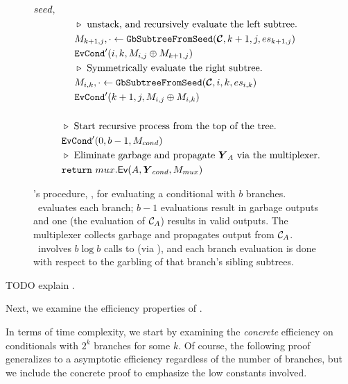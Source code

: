 \begin{figure}
\begin{align*}
{    seed,}\\
    &~~~~~~\codecomment{unstack, and recursively evaluate the left
    subtree.}\\
    &~~~~~~\mat_{k+1,j}, \cdot \gets \gbtree(\vec{\cir}, k+1, j, es_{k+1, j})\\
    &~~~~~~\evcond'(i, k, \mat_{i, j} \oplus \mat_{k+1,j})\\
    &~~~~~~\codecomment{Symmetrically evaluate the right subtree.}\\
    &~~~~~~\mat_{i, k}, \cdot \gets \gbtree(\vec{\cir}, i, k, es_{i,k})\\
    &~~~~~~\evcond'(k+1, j, \mat_{i, j} \oplus \mat_{i, k})\\
    \\
    &~~\codecomment{Start recursive process from the top of the tree.}\\
    &~~\evcond'(0, b-1, M_{cond})\\
    &~~\codecomment{Eliminate garbage and propagate $\vec{Y}_\aid$ via
    the multiplexer.}\\
    &~~\creturn~\evmux(\aid, \vec{Y}_{cond}, M_{mux})
  \end{align*}
  \caption{%
    \E's procedure, \evcond, for evaluating a conditional with $b$ branches.
    \evcond\ evaluates each branch; $b-1$ evaluations
    result in garbage outputs and one (the evaluation of
    $\mathcal C_{A}$) results in valid outputs.
    The multiplexer collects garbage and propagates output from
    $\mathcal C_{A}$.
    \evcond\ involves $b \log b$ calls to \gGb (via \gbtree), and each
    branch evaluation is done with respect to the garbling of that
    branch's sibling subtrees.
  }
\end{figure}

TODO explain \evcond.


Next, we examine the efficiency properties of \evcond.

In terms of time complexity, we start by examining the \emph{concrete}
efficiency on conditionals with $2^k$ branches for some $k$.
%
Of course, the following proof generalizes to a asymptotic efficiency
regardless of the number of branches, but we include the concrete
proof to emphasize the low constants involved.

